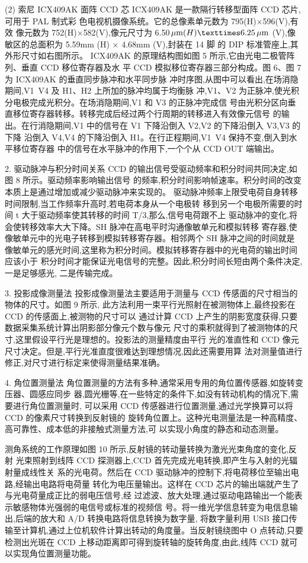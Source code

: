 \documentclass{ctexart}
\begin{document}
(2) 索尼 ICX409AK 面阵 CCD 芯
ICX409AK 是一款隔行转移型面阵 CCD 芯片,可用于 PAL 制式彩
色电视机摄像系统。它的总像素单元数为 795(H)×596(V),有效
像元数为 752(H)$\times$582(V),像元尺寸为 6.50$\SImum (H) × 6.25\SImum$
(V),像敏区的总面积为 5.59mm (H) $\times$ 4.68mm (V),封装在 14 脚
的 DIP 标准管座上,其外形尺寸如右图所示。
ICX409AK 的原理结构图如图 5 所示,它由光电二极管阵列、垂直 CCD 移位寄存器及水
平 CCD 模拟移位寄存器三部分构成。图 6、图 7 为 ICX409AK 的垂直同步脉冲和水平同步脉
冲时序图,从图中可以看出,在场消隐期间,V1~V4 及 H1、H2 上所加的脉冲均属于均衡脉
冲,V1、V2 为正脉冲,使光积分电极完成光积分。在场消隐期间,V1 和 V3 的正脉冲完成信
号由光积分区向垂直移位寄存器转移。转移完成后经过两个行周期的转移进入有效像元信号
的输出。在行消隐期间,V1 中的信号在 V1 下降沿倒入 V2,V2 的下降沿倒入 V3,V3 的下降
沿倒入 V4,V4 的下降沿倒入 H1。在行正程期间,V1~V4 保持不变,倒入到水平移位寄存器
中的信号在水平脉冲的作用下,一个个从 CCD OUT 端输出。

2. 驱动脉冲与积分时间关系
CCD 的输出信号受驱动频率和积分时间共同决定,如图 8 所示。驱动频率影响输出信号
的频率,积分时间影响帧速率。积分时间的改变本质上是通过增加或减少驱动脉冲来实现的。
驱动脉冲频率上限受电荷自身转移时间限制,当工作频率升高时,若电荷本身从一个电极转
移到另一个电极所需要的时间 t 大于驱动频率使其转移的时间 T/3,那么,信号电荷跟不上
驱动脉冲的变化,将会使转移效率大大下降。SH 脉冲在高电平时沟通像敏单元和模拟转移
寄存器,使像敏单元中的光电子转移到模拟转移寄存器。相邻两个 SH 脉冲之间的时间就是
像敏单元的感光时间,这里称为积分时间。模拟转移寄存器中的光电荷的输出时间应该小于
积分时间才能保证光电信号的完整。因此,积分时间长短由两个条件决定,一是足够感光,
二是传输完成。

3. 投影成像测量法
投影成像测量法主要适用于测量与 CCD 传感面的尺寸相当的物体的尺寸。如图 9 所示,
此方法利用一束平行光照射在被测物体上,最终投影在 CCD 的传感面上,被测物的尺寸可以
通过计算 CCD 上产生的阴影宽度获得,只要数据采集系统计算出阴影部分像元个数与像元
尺寸的乘积就得到了被测物体的尺寸,这里假设平行光是理想的。投影法的测量精度由平行
光的准直性和 CCD 像元尺寸决定。但是,平行光准直度很难达到理想情况,因此还需要用算
法对测量值进行修正,对尺寸进行标定来使得测量结果准确。

4. 角位置测量法
角位置测量的方法有多种,通常采用专用的角位置传感器,如旋转变压器、圆感应同步
器,圆光栅等,在一些特定的条件下,如没有转动机构的情况下,需要进行角位置测量时,
可以采用 CCD 传感器进行位置测量,通过光学换算可以将 CCD 的像素尺寸转换到反射镜的
旋转角位置上。这种光电测量法是一种高精度、高可靠性、成本低的非接触式测量方法,可
以实现小角度的静态和动态测量。

测角系统的工作原理如图 10 所示,反射镜的转动量转换为激光光束角度的变化,反射
光束照射到线阵 CCD 探测器上,CCD 首先完成光电转换,即产生与入射的光辐射量成线性关
系的光电荷。然后在 CCD 驱动脉冲的控制下,将电荷移位至输出电路,经输出电路将电荷量
转化为电压量输出。这样在 CCD 芯片的输出端就产生了与光电荷量成正比的弱电压信号,经
过滤波、放大处理,通过驱动电路输出一个能表示敏感物体光强弱的电信号或标准的视频信
号。将一维光学信息转变为电信息输出,后端的放大和 A/D 转换电路将信息转换为数字量,
将数字量利用 USB 接口传输至计算机,通过上位机软件计算出转动的角度量。当反射镜绕图中 O 点转动,只要检测出光斑在 CCD 上移动距离即可得到旋转轴的旋转角度,由此,线阵
CCD 就可以实现角位置测量功能。
\end{document}
